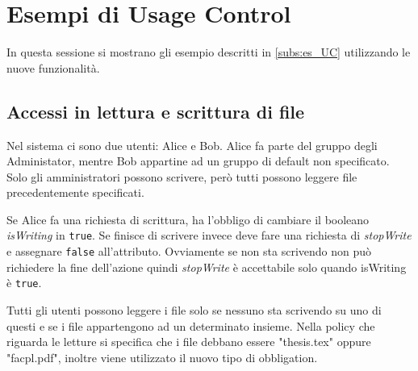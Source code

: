 \section{Esempi di Usage Control}
\label{sec:Esempi}
In questa sessione si mostrano gli esempio descritti in \ref{subs:es_UC} utilizzando le nuove funzionalità.
\subsection{Accessi in lettura e scrittura di file}
\label{sub:RW_Code_Sec}
Nel sistema ci sono due utenti: Alice e Bob. Alice fa parte del gruppo degli Administator,
mentre Bob appartine ad un gruppo di default non specificato. Solo gli amministratori possono scrivere,
però tutti possono leggere file precedentemente specificati.

Se Alice fa una richiesta di scrittura, ha l'obbligo di cambiare il booleano \emph{isWriting} in \texttt{true}.
Se finisce di scrivere invece deve fare una richiesta di \emph{stopWrite} e assegnare \texttt{false} all'attributo.
Ovviamente se non sta scrivendo non può richiedere la fine dell'azione quindi \emph{stopWrite} è accettabile solo quando
isWriting è \texttt{true}.

Tutti gli utenti possono leggere i file solo se nessuno sta scrivendo su uno di questi e
se i file appartengono ad un determinato insieme. Nella policy che riguarda le letture si specifica che i
file debbano essere "thesis.tex" oppure "facpl.pdf", inoltre viene utilizzato il nuovo tipo di obbligation.

